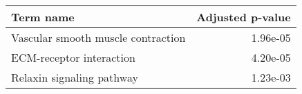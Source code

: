 \begin{tabular}{lr}
\toprule
                         Term name &  Adjusted p-value \\
\midrule
Vascular smooth muscle contraction &          1.96e-05 \\
          ECM-receptor interaction &          4.20e-05 \\
         Relaxin signaling pathway &          1.23e-03 \\
\bottomrule
\end{tabular}
